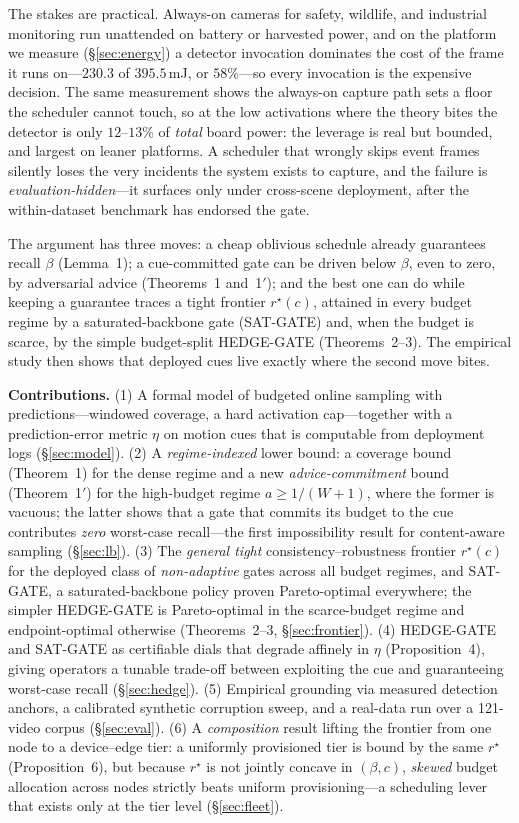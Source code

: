 ﻿\documentclass[lettersize,journal]{IEEEtran}
\begin{document}
The stakes are practical. Always-on cameras for safety, wildlife, and industrial monitoring run unattended on battery or harvested power, and on the platform we measure (\S\ref{sec:energy}) a detector invocation dominates the cost of the frame it runs on---$230.3$ of $395.5$\,mJ, or $58\%$---so every invocation is the expensive decision. The same measurement shows the always-on capture path sets a floor the scheduler cannot touch, so at the low activations where the theory bites the detector is only $12$--$13\%$ of \emph{total} board power: the leverage is real but bounded, and largest on leaner platforms. A scheduler that wrongly skips event frames silently loses the very incidents the system exists to capture, and the failure is \emph{evaluation-hidden}---it surfaces only under cross-scene deployment, after the within-dataset benchmark has endorsed the gate.

The argument has three moves: a cheap oblivious schedule already guarantees recall $\beta$ (Lemma~1); a cue-committed gate can be driven below $\beta$, even to zero, by adversarial advice (Theorems~1 and~1$'$); and the best one can do while keeping a guarantee traces a tight frontier $r^\star(c)$, attained in every budget regime by a saturated-backbone gate (SAT-GATE) and, when the budget is scarce, by the simple budget-split HEDGE-GATE (Theorems~2--3). The empirical study then shows that deployed cues live exactly where the second move bites.

\noindent\textbf{Contributions.} (1) A formal model of budgeted online sampling with predictions---windowed coverage, a hard activation cap---together with a prediction-error metric $\eta$ on motion cues that is computable from deployment logs (\S\ref{sec:model}). (2) A \emph{regime-indexed} lower bound: a coverage bound (Theorem~1) for the dense regime and a new \emph{advice-commitment} bound (Theorem~1$'$) for the high-budget regime $a\ge 1/(W{+}1)$, where the former is vacuous; the latter shows that a gate that commits its budget to the cue contributes \emph{zero} worst-case recall---the first impossibility result for content-aware sampling (\S\ref{sec:lb}). (3) The \emph{general tight} consistency--robustness frontier $r^\star(c)$ for the deployed class of \emph{non-adaptive} gates across all budget regimes, and SAT-GATE, a saturated-backbone policy proven Pareto-optimal everywhere; the simpler HEDGE-GATE is Pareto-optimal in the scarce-budget regime and endpoint-optimal otherwise (Theorems~2--3, \S\ref{sec:frontier}). (4) HEDGE-GATE and SAT-GATE as certifiable dials that degrade affinely in $\eta$ (Proposition~4), giving operators a tunable trade-off between exploiting the cue and guaranteeing worst-case recall (\S\ref{sec:hedge}). (5) Empirical grounding via measured detection anchors, a calibrated synthetic corruption sweep, and a real-data run over a 121-video corpus (\S\ref{sec:eval}). (6) A \emph{composition} result lifting the frontier from one node to a device--edge tier: a uniformly provisioned tier is bound by the same $r^\star$ (Proposition~6), but because $r^\star$ is not jointly concave in $(\beta,c)$, \emph{skewed} budget allocation across nodes strictly beats uniform provisioning---a scheduling lever that exists only at the tier level (\S\ref{sec:fleet}).
\end{document}

